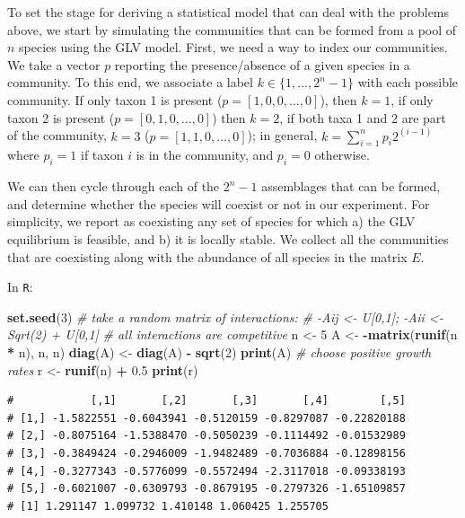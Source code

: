 \documentclass[
]{book}
\newenvironment{Shaded}{\begin{snugshade}}{\end{snugshade}}
\newcommand{\CommentTok}[1]{\textcolor[rgb]{0.56,0.35,0.01}{\textit{#1}}}
\newcommand{\DecValTok}[1]{\textcolor[rgb]{0.00,0.00,0.81}{#1}}
\newcommand{\FloatTok}[1]{\textcolor[rgb]{0.00,0.00,0.81}{#1}}
\newcommand{\KeywordTok}[1]{\textcolor[rgb]{0.13,0.29,0.53}{\textbf{#1}}}
\newcommand{\NormalTok}[1]{#1}
\newcommand{\OperatorTok}[1]{\textcolor[rgb]{0.81,0.36,0.00}{\textbf{#1}}}
\newcommand{\StringTok}[1]{\textcolor[rgb]{0.31,0.60,0.02}{#1}}
\begin{document}
To set the stage for deriving a statistical model that can deal with the problems above, we start by simulating the communities that can be formed from a pool of \(n\) species using the GLV model. First, we need a way to index our communities. We take a vector \(p\) reporting the presence/absence of a given species in a community. To this end, we associate a label \(k \in \{1, \ldots, 2^n -1\}\) with each possible community. If only taxon 1 is present (\(p = [1,0,0,\ldots,0]\)), then \(k = 1\), if only taxon 2 is present (\(p =[0,1,0,\ldots,0]\)) then \(k = 2\), if both taxa 1 and 2 are part of the community, \(k = 3\) (\(p = [1,1,0,\ldots,0]\)); in general, \(k = \sum_{i = 1}^n p_i 2^{(i-1)}\) where \(p_i = 1\) if taxon \(i\) is in the community, and \(p_i = 0\) otherwise.

We can then cycle through each of the \(2^n - 1\) assemblages that can be formed, and determine whether the species will coexist or not in our experiment. For simplicity, we report as coexisting any set of species for which a) the GLV equilibrium is feasible, and b) it is locally stable. We collect all the communities that are coexisting along with the abundance of all species in the matrix \(E\).

In \texttt{R}:

\begin{Shaded}
\begin{Highlighting}[]
\KeywordTok{set.seed}\NormalTok{(}\DecValTok{3}\NormalTok{)}
\CommentTok{# take a random matrix of interactions: }
\CommentTok{# -Aij <- U[0,1]; -Aii <- Sqrt(2) + U[0,1]}
\CommentTok{# all interactions are competitive}
\NormalTok{n <-}\StringTok{ }\DecValTok{5}
\NormalTok{A <-}\StringTok{ }\OperatorTok{-}\KeywordTok{matrix}\NormalTok{(}\KeywordTok{runif}\NormalTok{(n }\OperatorTok{*}\StringTok{ }\NormalTok{n), n, n)}
\KeywordTok{diag}\NormalTok{(A) <-}\StringTok{ }\KeywordTok{diag}\NormalTok{(A) }\OperatorTok{-}\StringTok{ }\KeywordTok{sqrt}\NormalTok{(}\DecValTok{2}\NormalTok{)}
\KeywordTok{print}\NormalTok{(A)}
\CommentTok{# choose positive growth rates}
\NormalTok{r <-}\StringTok{ }\KeywordTok{runif}\NormalTok{(n) }\OperatorTok{+}\StringTok{ }\FloatTok{0.5}
\KeywordTok{print}\NormalTok{(r)}
\end{Highlighting}
\end{Shaded}

\begin{verbatim}
#            [,1]       [,2]       [,3]       [,4]        [,5]
# [1,] -1.5822551 -0.6043941 -0.5120159 -0.8297087 -0.22820188
# [2,] -0.8075164 -1.5388470 -0.5050239 -0.1114492 -0.01532989
# [3,] -0.3849424 -0.2946009 -1.9482489 -0.7036884 -0.12898156
# [4,] -0.3277343 -0.5776099 -0.5572494 -2.3117018 -0.09338193
# [5,] -0.6021007 -0.6309793 -0.8679195 -0.2797326 -1.65109857
# [1] 1.291147 1.099732 1.410148 1.060425 1.255705
\end{verbatim}
\end{document}
